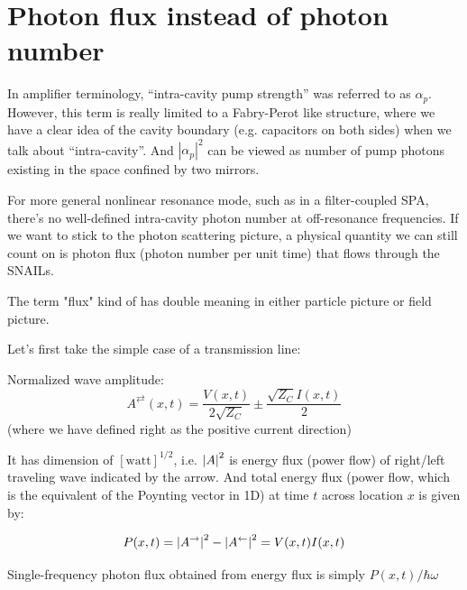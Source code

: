 \documentclass[aip,reprint]{revtex4-2}
\begin{document}

\newpage

\newpage

\newpage

\appendix



\section{Photon flux instead of photon number}\label{appen:flux}

In amplifier terminology, “intra-cavity pump strength” was referred to as $\alpha_p$. However, this term is really limited to a Fabry-Perot like structure, where we have a clear idea of the cavity boundary (e.g. capacitors on both sides) when we talk about “intra-cavity”. And $|\alpha_p|^2$ can be viewed as number of pump photons existing in the space confined by two mirrors. 

For more general nonlinear resonance mode, such as in a filter-coupled SPA, there’s no well-defined intra-cavity photon number at off-resonance frequencies. If we want to stick to the photon scattering picture, a physical quantity we can still count on is photon flux (photon number per unit time) that flows through the SNAILs. 

The term "flux" kind of has double meaning in either particle picture or field picture. 

Let's first take the simple case of a transmission line: 

Normalized wave amplitude: 
\begin{equation}
A^\rightleftarrows (x,t) = \frac{V(x,t)}{2\sqrt{Z_C}} \pm \frac{\sqrt{Z_C} I(x,t)}{2}
\end{equation}
(where we have defined right as the positive current direction)

It has dimension of $\mathrm{[watt]}^{1/2}$, i.e. $\left | A \right |^2$ is energy flux (power flow) of right/left traveling wave indicated by the arrow. And total energy flux (power flow, which is the equivalent of the Poynting vector in 1D) at time $t$ across location $x$ is given by: 

\begin{equation}
P(x,t) = \abs{A^\rightarrow}^2 - \abs{A^\leftarrow}^2  = V(x,t) I(x,t)
\end{equation}

Single-frequency photon flux obtained from energy flux is simply $P(x,t)/\hbar \omega$
\end{document}
